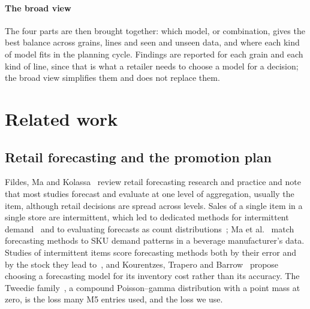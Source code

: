 \paragraph{The broad view} The four parts are then brought together: which
model, or combination, gives the best balance across grains, lines and seen and
unseen data, and where each kind of model fits in the planning cycle. Findings
are reported for each grain and each kind of line, since that is what a
retailer needs to choose a model for a decision; the broad view simplifies them
and does not replace them.

\section{Related work}
\label{sec:related}

\subsection{Retail forecasting and the promotion plan}

Fildes, Ma and Kolassa~\cite{fildes2022} review retail forecasting research and
practice and note that most studies forecast and evaluate at one level of
aggregation, usually the item, although retail decisions are spread across
levels. Sales of a single item in a single store are intermittent, which led to
dedicated methods for intermittent demand~\cite{croston,syntetos2005} and to
evaluating forecasts as count distributions~\cite{kolassa2016}; Ma et al.~\cite{ma2025}
match forecasting methods to SKU demand patterns in a beverage manufacturer's data. Studies of intermittent
items score forecasting methods both by their error and by the stock they lead
to~\cite{babai2014,babai2019}, and Kourentzes, Trapero and Barrow~\cite{kourentzes2020}
propose choosing a forecasting model for its inventory cost rather than its accuracy. The Tweedie
family~\cite{jorgensen1987}, a compound Poisson--gamma distribution with a point
mass at zero, is the loss many M5 entries used, and the loss we use.

